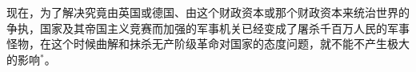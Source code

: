 \leftskip=0mm

现在，为了解决究竟由英国或德国、由这个财政资本或那个财政资本来统治世界的争执，国家及其帝国主义竞赛而加强的军事机关已经变成了屠杀千百万人民的军事怪物，在这个时候曲解和抹杀无产阶级革命对国家的态度问题，就不能不产生极大的影响$^{*}$。

\centering {\rule[-1pt]{2.5cm}{0.1em} }

\leftskip=0mm













